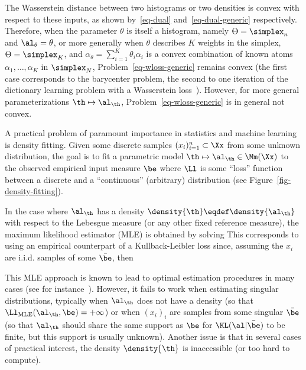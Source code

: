 The Wasserstein distance between two histograms or two densities is convex with respect to these inputs, as shown by~\eqref{eq-dual} and~\eqref{eq-dual-generic} respectively. Therefore, when the parameter $\theta$ is itself a histogram, namely $\Theta=\simplex_n$ and $\al_\theta=\theta$, or more generally when $\theta$ describes $K$ weights in the simplex, $\Theta=\simplex_K$, and $\alpha_\theta=\sum_{i=1}^K \theta_i \alpha_i$ is a convex combination of known atoms $\alpha_1,\dots,\alpha_K$ in $\simplex_N$, Problem~\eqref{eq-wloss-generic} remains convex (the first case corresponds to the barycenter problem, the second to one iteration of the dictionary learning problem with a Wasserstein loss~\cite{pmlr-v51-rolet16}). However, for more general parameterizations $\th\mapsto \al_\th$, Problem~\eqref{eq-wloss-generic} is in general not convex.


A practical problem of paramount importance in statistics and machine learning is density fitting.
%
Given some discrete samples $(x_i)_{i=1}^n \subset \Xx$ from some unknown distribution, the goal is to fit a parametric model $\th \mapsto \al_\th \in \Mm(\Xx)$ to the observed empirical input measure $\be$
where $\Ll$ is some ``loss'' function between a discrete and a ``continuous'' (arbitrary) distribution (see Figure~\ref{fig-density-fitting}).

In the case where $\al_\th$ has a density $\density{\th} \eqdef \density{\al_\th}$ with respect to the Lebesgue measure (or any other fixed reference measure), the maximum likelihood estimator (MLE) is obtained by solving
This corresponds to using an empirical counterpart of a Kullback-Leibler loss since, assuming the $x_i$ are i.i.d. samples of some $\bar\be$, then

\newcommand{\fPF}{h}

This MLE approach is known to lead to optimal estimation procedures in many cases (see for instance~\cite{owen2001empirical}). However, it fails to work when estimating singular distributions, typically when $\al_\th$ does not have a density (so that $\Ll_{\text{MLE}}(\al_\th,\be) = +\infty$) or when $(x_i)_i$ are samples from some singular $\bar\be$ (so that $\al_\th$ should share the same support as $\be$ for $\KL(\al|\bar\be)$ to be finite, but this support is usually unknown). Another issue is that in several cases of practical interest, the density $\density{\th}$ is inaccessible (or too hard to compute).

